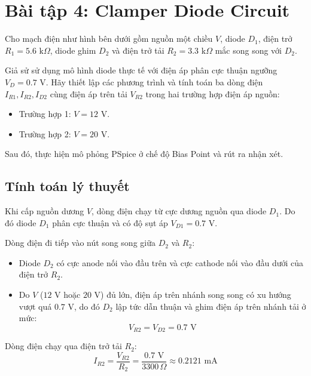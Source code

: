 \section{Bài tập 4: Clamper Diode Circuit}

Cho mạch điện như hình bên dưới gồm nguồn một chiều $V$, diode $D_1$, điện trở $R_1 = 5.6\text{ k}\Omega$, diode ghim $D_2$ và điện trở tải $R_2 = 3.3\text{ k}\Omega$ mắc song song với $D_2$.

Giả sử sử dụng mô hình diode thực tế với điện áp phân cực thuận ngưỡng $V_D = 0.7\text{ V}$. Hãy thiết lập các phương trình và tính toán ba dòng điện $I_{R1}, I_{R2}, I_{D2}$ cùng điện áp trên tải $V_{R2}$ trong hai trường hợp điện áp nguồn:
\begin{itemize}[leftmargin=1.5em]
  \item Trường hợp 1: $V = 12\text{ V}$.
  \item Trường hợp 2: $V = 20\text{ V}$.
\end{itemize}
Sau đó, thực hiện mô phỏng PSpice ở chế độ Bias Point và rút ra nhận xét.


\subsection{Tính toán lý thuyết}
Khi cấp nguồn dương $V$, dòng điện chạy từ cực dương nguồn qua diode $D_1$. Do đó diode $D_1$ phân cực thuận và có độ sụt áp $V_{D1} = 0.7\text{ V}$.

\noindent Dòng điện đi tiếp vào nút song song giữa $D_2$ và $R_2$:
\begin{itemize}[leftmargin=1.5em]
  \item Diode $D_2$ có cực anode nối vào đầu trên và cực cathode nối vào đầu dưới của điện trở $R_2$.
  \item Do $V$ ($12\text{ V}$ hoặc $20\text{ V}$) đủ lớn, điện áp trên nhánh song song có xu hướng vượt quá $0.7\text{ V}$, do đó $D_2$ lập tức dẫn thuận và ghim điện áp trên nhánh tải ở mức:
  \begin{equation}
    V_{R2} = V_{D2} = 0.7\text{ V}
  \end{equation}
\end{itemize}

\noindent Dòng điện chạy qua điện trở tải $R_2$:
\begin{equation}
  I_{R2} = \frac{V_{R2}}{R_2} = \frac{0.7\text{ V}}{3300\,\Omega} \approx 0.2121\text{ mA}
\end{equation}

